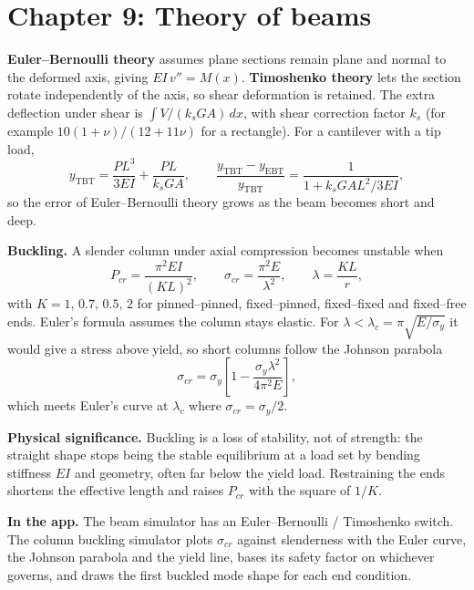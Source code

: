 \documentclass[11pt,a4paper]{article}
\newcommand{\app}[1]{\par\smallskip\noindent\textbf{In the app.} #1}
\newcommand{\sig}[1]{\par\smallskip\noindent\textbf{Physical significance.} #1}
\begin{document}
\section{Chapter 9: Theory of beams}
\textbf{Euler--Bernoulli theory} assumes plane sections remain plane and normal to the deformed axis, giving $EI\,v''=M(x)$. \textbf{Timoshenko theory} lets the section rotate independently of the axis, so shear deformation is retained. The extra deflection under shear is $\int V/(k_sGA)\,dx$, with shear correction factor $k_s$ (for example $10(1+\nu)/(12+11\nu)$ for a rectangle). For a cantilever with a tip load,
\begin{equation}
y_{\text{TBT}}=\frac{PL^3}{3EI}+\frac{PL}{k_sGA},\qquad
\frac{y_{\text{TBT}}-y_{\text{EBT}}}{y_{\text{TBT}}}=\frac{1}{1+k_sGAL^2/3EI},
\end{equation}
so the error of Euler--Bernoulli theory grows as the beam becomes short and deep.

\textbf{Buckling.} A slender column under axial compression becomes unstable when
\begin{equation}
P_{cr}=\frac{\pi^2EI}{(KL)^2},\qquad \sigma_{cr}=\frac{\pi^2E}{\lambda^2},\qquad \lambda=\frac{KL}{r},
\end{equation}
with $K=1,\,0.7,\,0.5,\,2$ for pinned--pinned, fixed--pinned, fixed--fixed and fixed--free ends.
Euler's formula assumes the column stays elastic. For $\lambda<\lambda_c=\pi\sqrt{E/\sigma_y}$ it would give a stress above yield, so short columns follow the Johnson parabola
\begin{equation}
\sigma_{cr}=\sigma_y\left[1-\frac{\sigma_y\lambda^2}{4\pi^2E}\right],
\end{equation}
which meets Euler's curve at $\lambda_c$ where $\sigma_{cr}=\sigma_y/2$.

\sig{Buckling is a loss of stability, not of strength: the straight shape stops being the stable equilibrium at a load set by bending stiffness $EI$ and geometry, often far below the yield load. Restraining the ends shortens the effective length and raises $P_{cr}$ with the square of $1/K$.}
\app{The beam simulator has an Euler--Bernoulli / Timoshenko switch. The column buckling simulator plots $\sigma_{cr}$ against slenderness with the Euler curve, the Johnson parabola and the yield line, bases its safety factor on whichever governs, and draws the first buckled mode shape for each end condition.}
\end{document}
